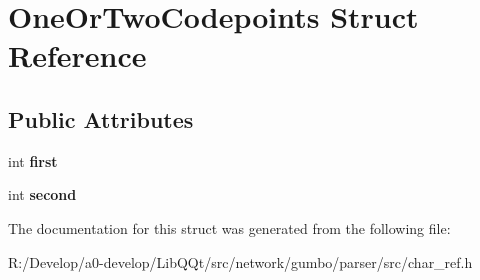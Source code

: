 \hypertarget{struct_one_or_two_codepoints}{}\section{One\+Or\+Two\+Codepoints Struct Reference}
\label{struct_one_or_two_codepoints}
\subsection*{Public Attributes}
\begin{DoxyCompactItemize}
\item 
\mbox{\label{struct_one_or_two_codepoints_aa5d7ad79f9caf778d04453ed228b51b1}} 
int {\bfseries first}
\item 
\mbox{\label{struct_one_or_two_codepoints_a61db47ddf53baf04ae6ef624cfb96ee2}} 
int {\bfseries second}
\end{DoxyCompactItemize}


The documentation for this struct was generated from the following file\+:\begin{DoxyCompactItemize}
\item 
R\+:/\+Develop/a0-\/develop/\+Lib\+Q\+Qt/src/network/gumbo/parser/src/char\+\_\+ref.\+h\end{DoxyCompactItemize}
